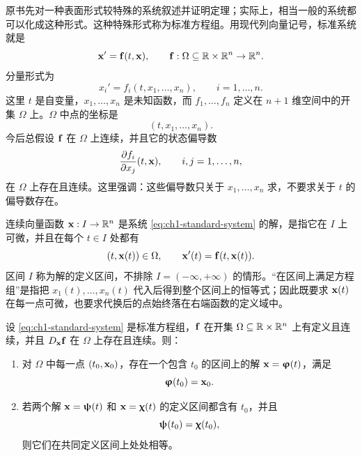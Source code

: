 原书先对一种表面形式较特殊的系统叙述并证明定理；实际上，相当一般的系统都可以化成这种形式。这种特殊形式称为标准方程组。用现代列向量记号，标准系统就是
\begin{equation}
 \vect{x}'=\vect{f}(t,\vect{x}),
 \qquad
 \vect{f}:\Omega\subseteq\R\times\R^n\to\R^n.
 \label{eq:ch1-standard-system}
\end{equation}
分量形式为
\begin{equation}
 x_i'=f_i(t,x_1,\ldots,x_n),
 \qquad i=1,\ldots,n.
 \label{eq:ch1-standard-components}
\end{equation}
这里 \(t\) 是自变量，\(x_1,\ldots,x_n\) 是未知函数，而 \(f_1,\ldots,f_n\) 定义在 \(n+1\) 维空间中的开集 \(\Omega\) 上。\(\Omega\) 中点的坐标是
\[
 (t,x_1,\ldots,x_n).
\]
今后总假设 \(\vect{f}\) 在 \(\Omega\) 上连续，并且它的状态偏导数
\begin{equation}
 \frac{\partial f_i}{\partial x_j}(t,\vect{x}),
 \qquad i,j=1,\ldots,n,
 \label{eq:ch1-state-partials}
\end{equation}
在 \(\Omega\) 上存在且连续。这里强调：这些偏导数只关于 \(x_1,\ldots,x_n\) 求，不要求关于 \(t\) 的偏导数存在。

连续向量函数 \(\vect{x}:I\to\R^n\) 是系统 \eqref{eq:ch1-standard-system} 的解，是指它在 \(I\) 上可微，并且在每个 \(t\in I\) 处都有
\[
 (t,\vect{x}(t))\in\Omega,
 \qquad
 \vect{x}'(t)=\vect{f}(t,\vect{x}(t)).
\]
区间 \(I\) 称为解的定义区间，不排除 \(I=(-\infty,+\infty)\) 的情形。“在区间上满足方程组”是指把 \(x_1(t),\ldots,x_n(t)\) 代入后得到整个区间上的恒等式；因此既要求 \(\vect{x}(t)\) 在每一点可微，也要求代换后的点始终落在右端函数的定义域中。

\begin{theorem}[标准方程组的存在唯一性]
 \label{thm:ch1-system-existence}
 设 \eqref{eq:ch1-standard-system} 是标准方程组，\(\vect{f}\) 在开集 \(\Omega\subseteq\mathbb R\times\mathbb R^n\) 上有定义且连续，并且 \(D_{\vect{x}}\vect{f}\) 在 \(\Omega\) 上存在且连续。则：
 \begin{enumerate}[label=\arabic*.]
  \item 对 \(\Omega\) 中每一点 \((t_0,\vect{x}_0)\)，存在一个包含 \(t_0\) 的区间上的解 \(\vect{x}=\vect{\varphi}(t)\)，满足
  \[
   \vect{\varphi}(t_0)=\vect{x}_0.
  \]
  \item 若两个解 \(\vect{x}=\vect{\psi}(t)\) 和 \(\vect{x}=\vect{\chi}(t)\) 的定义区间都含有 \(t_0\)，并且
  \[
   \vect{\psi}(t_0)=\vect{\chi}(t_0),
  \]
  则它们在共同定义区间上处处相等。
 \end{enumerate}
\end{theorem}

